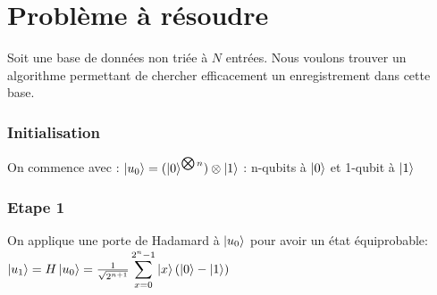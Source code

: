 \section{Problème à résoudre}
Soit une base de données non triée à $N$ entrées. Nous voulons trouver un algorithme permettant de chercher efficacement un enregistrement dans cette base.





\subsubsection*{Initialisation}

On commence avec :
$\ket{u_0} = (\ket{0}^{\bigotimes n}) \otimes \ket{1}$
: n-qubits à $\ket{0}$ et 1-qubit à $\ket{1}$

\subsubsection*{Etape 1}

On applique une porte de Hadamard à $\ket{u_0}$ pour avoir un état équiprobable:
$\ket{u_1} = H\ket{u_0} = \frac{1}{\sqrt{2^{n + 1}}}
\displaystyle\sum_{x=0}^{2^n-1} \ket{x}(\ket{0} - \ket{1})$

